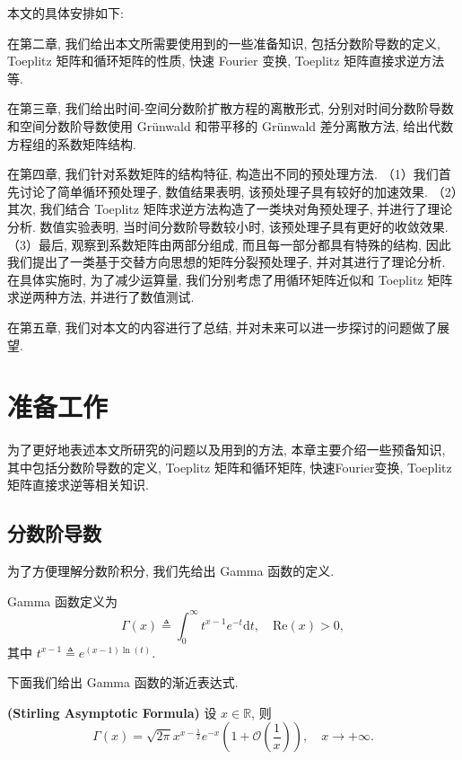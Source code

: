 \documentclass{ecnumaster}
\begin{document}
本文的具体安排如下:


在第二章, 我们给出本文所需要使用到的一些准备知识,
包括分数阶导数的定义, Toeplitz 矩阵和循环矩阵的性质,
快速 Fourier 变换, Toeplitz 矩阵直接求逆方法等.

在第三章, 我们给出时间-空间分数阶扩散方程的离散形式,
分别对时间分数阶导数和空间分数阶导数使用 Gr\"unwald 和带平移的 Gr\"unwald 差分离散方法,
给出代数方程组的系数矩阵结构.

在第四章, 我们针对系数矩阵的结构特征, 构造出不同的预处理方法.
（1）我们首先讨论了简单循环预处理子, 数值结果表明, 该预处理子具有较好的加速效果.
（2）其次, 我们结合 Toeplitz 矩阵求逆方法构造了一类块对角预处理子, 并进行了理论分析.
数值实验表明, 当时间分数阶导数较小时, 该预处理子具有更好的收敛效果.
（3）最后, 观察到系数矩阵由两部分组成, 而且每一部分都具有特殊的结构,
因此我们提出了一类基于交替方向思想的矩阵分裂预处理子, 并对其进行了理论分析.
在具体实施时, 为了减少运算量, 我们分别考虑了用循环矩阵近似和
Toeplitz 矩阵求逆两种方法, 并进行了数值测试.

在第五章, 我们对本文的内容进行了总结, 并对未来可以进一步探讨的问题做了展望.



\chapter{准备工作}
为了更好地表述本文所研究的问题以及用到的方法,
本章主要介绍一些预备知识,
其中包括分数阶导数的定义, Toeplitz 矩阵和循环矩阵,
快速Fourier变换, Toeplitz 矩阵直接求逆等相关知识.

\section{分数阶导数}
为了方便理解分数阶积分, 我们先给出 Gamma 函数的定义.
\begin{definition}\label{def21}
Gamma 函数定义为
\begin{equation}\nonumber
  \Gamma(x) \triangleq \int_0^{\infty}t^{x - 1}e^{-t}\mathrm{d}t, \quad \mathrm{Re}(x) > 0,
\end{equation}
其中 $t^{x - 1} \triangleq e^{(x - 1)\ln (t)}.$
\end{definition}

下面我们给出 Gamma 函数的渐近表达式.
\begin{theorem}\label{thgamma1}
  \textbf{(Stirling Asymptotic Formula)} 设 $x \in \mathbb{R}$, 则
  \begin{equation}\nonumber
  \Gamma (x) = \sqrt{2 \pi} x^{x- \frac{1}{2}} e^{-x} \left(1 + \mathcal{O} \left(\frac{1}{x}\right)\right), \quad x \to +\infty.
  \end{equation}
\end{theorem}
\end{document}

